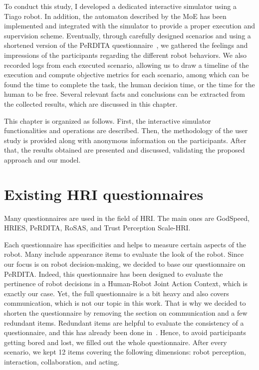 To conduct this study, I developed a dedicated interactive simulator using a Tiago robot. In addition, the automaton described by the MoE has been implemented and integrated with the simulator to provide a proper execution and supervision scheme. Eventually, through carefully designed scenarios and using a shortened version of the PeRDITA questionnaire~\cite{devin_evaluating_2018}, we gathered the feelings and impressions of the participants regarding the different robot behaviors. We also recorded logs from each executed scenario, allowing us to draw a timeline of the execution and compute objective metrics for each scenario, among which can be found the time to complete the task, the human decision time, or the time for the human to be free. Several relevant facts and conclusions can be extracted from the collected results, which are discussed in this chapter.

This chapter is organized as follows. First, the interactive simulator functionalities and operations are described. Then, the methodology of the user study is provided along with anonymous information on the participants. After that, the results obtained are presented and discussed, validating the proposed approach and our model.

\section{Existing HRI questionnaires}

Many questionnaires are used in the field of HRI. The main ones are GodSpeed, HRIES, PeRDITA, RoSAS, and Trust Perception Scale-HRI. 

Each questionnaire has specificities and helps to measure certain aspects of the robot. Many include appearance items to evaluate the look of the robot. Since our focus is on robot decision-making, we decided to base our questionnaire on PeRDITA. Indeed, this questionnaire has been designed to evaluate the pertinence of robot decisions in a Human-Robot Joint Action Context, which is exactly our case. Yet, the full questionnaire is a bit heavy and also covers communication, which is not our topic in this work. 
That is why we decided to shorten the questionnaire by removing the section on communication and a few redundant items. Redundant items are helpful to evaluate the consistency of a questionnaire, and this has already been done in~\cite{devin_evaluating_2018}. Hence, to avoid participants getting bored and lost, we filled out the whole questionnaire. After every scenario, we kept 12 items covering the following dimensions: robot perception, interaction, collaboration, and acting.



